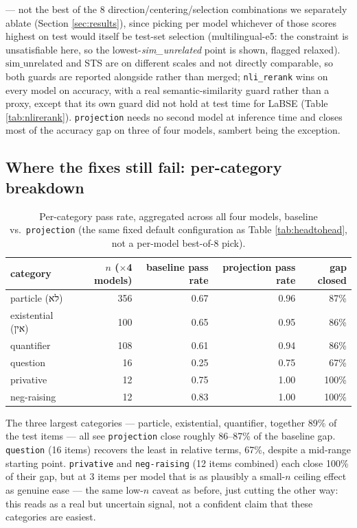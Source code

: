 \documentclass{article}
\newcommand{\heb}[1]{{\hebrewfont #1}}
\begin{document}
\begin{table}[h]
{--- not the best of the 8 direction/centering/selection combinations we
separately ablate (Section \ref{sec:results}), since picking per model
whichever of those scores highest on test would itself be test-set
selection (multilingual-e5: the constraint is unsatisfiable here, so the
lowest-\emph{sim\_unrelated} point is shown, flagged relaxed).
$\mathrm{sim\_unrelated}$ and STS are on different scales and not directly
comparable, so both guards are reported alongside rather than merged;
\texttt{nli\_rerank} wins on every model on accuracy, with a real
semantic-similarity guard rather than a proxy, except that its own guard
did not hold at test time for LaBSE (Table \ref{tab:nlirerank}).
\texttt{projection} needs no second model at inference time and closes
most of the accuracy gap on three of four models, sambert being the
exception.}
\label{tab:headtohead}
\end{table}

\subsection{Where the fixes still fail: per-category breakdown}

\begin{table}[h]
\centering
\small
\begin{tabular}{lrrrr}
\toprule
category & $n$ ($\times$4 models) & baseline pass rate & projection pass rate & gap closed \\
\midrule
particle (\heb{לא}) & 356 & 0.67 & 0.96 & 87\% \\
existential (\heb{אין}) & 100 & 0.65 & 0.95 & 86\% \\
quantifier & 108 & 0.61 & 0.94 & 86\% \\
question & 16 & 0.25 & 0.75 & 67\% \\
privative & 12 & 0.75 & 1.00 & 100\% \\
neg-raising & 12 & 0.83 & 1.00 & 100\% \\
\bottomrule
\end{tabular}
\caption{Per-category pass rate, aggregated across all four models,
baseline vs.\ \texttt{projection} (the same fixed default configuration as
Table \ref{tab:headtohead}, not a per-model best-of-8 pick).}
\label{tab:percategory}
\end{table}

The three largest categories --- particle, existential, quantifier,
together 89\% of the test items --- all see \texttt{projection} close
roughly 86--87\% of the baseline gap. \texttt{question} (16 items) recovers
the least in relative terms, 67\%, despite a mid-range starting point.
\texttt{privative} and \texttt{neg-raising} (12 items combined) each close
100\% of their gap, but at 3 items per model that is as plausibly a
small-$n$ ceiling effect as genuine ease --- the same low-$n$ caveat as
before, just cutting the other way: this reads as a real but uncertain
signal, not a confident claim that these categories are easiest.
\end{document}
